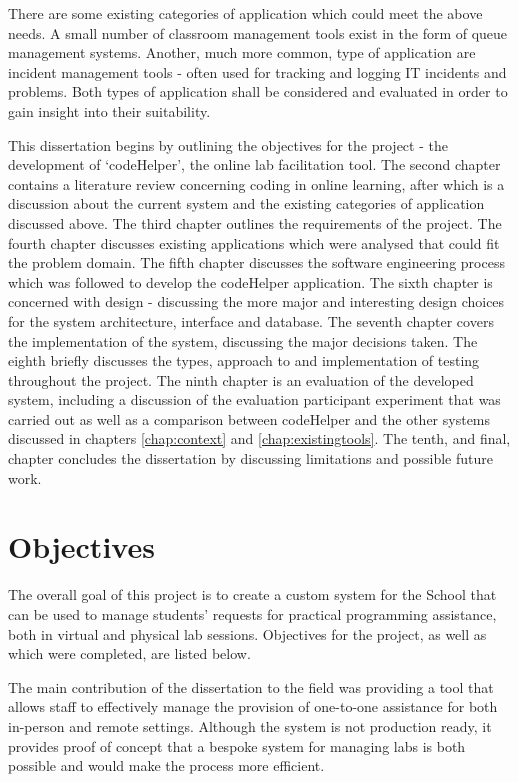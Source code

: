 There are some existing categories of application which could meet the above needs. A small number of classroom management tools exist in the form of queue management systems. Another, much more common, type of application are incident management tools - often used for tracking and logging IT incidents and problems. Both types of application shall be considered and evaluated in order to gain insight into their suitability.

This dissertation begins by outlining the objectives for the project - the development of `codeHelper', the online lab facilitation tool. The second chapter contains a literature review concerning coding in online learning, after which is a discussion about the current system and the existing categories of application discussed above. The third chapter outlines the requirements of the project. The fourth chapter discusses existing applications which were analysed that could fit the problem domain. The fifth chapter discusses the software engineering process which was followed to develop the codeHelper application. The sixth chapter is concerned with design - discussing the more major and interesting design choices for the system architecture, interface and database. The seventh chapter covers the implementation of the system, discussing the major decisions taken. The eighth briefly discusses the types, approach to and implementation of testing throughout the project. The ninth chapter is an evaluation of the developed system, including a discussion of the evaluation participant experiment that was carried out as well as a comparison between codeHelper and the other systems discussed in chapters \ref{chap:context} and \ref{chap:existingtools}. The tenth, and final, chapter concludes the dissertation by discussing limitations and possible future work.

\newpage
\section{Objectives}

The overall goal of this project is to create a custom system for the School that can be used to manage students' requests for practical programming assistance, both in virtual and physical lab sessions. Objectives for the project, as well as which were completed, are listed below. 

The main contribution of the dissertation to the field was providing a tool that allows staff to effectively manage the provision of one-to-one assistance for both in-person and remote settings. Although the system is not production ready, it provides proof of concept that a bespoke system for managing labs is both possible and would make the process more efficient.

